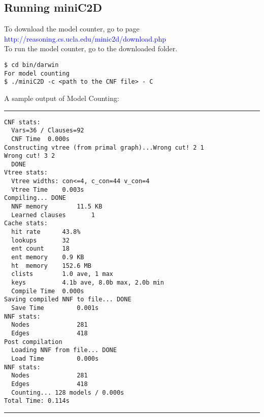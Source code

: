 \subsection*{Running miniC2D}
To download the model counter, go to page \textcolor{blue}{http://reasoning.cs.ucla.edu/minic2d/download.php}\\
To run the model counter, go to the downloaded folder.
\begin{lstlisting}
$ cd bin/darwin
For model counting
$ ./miniC2D -c <path to the CNF file> - C
\end{lstlisting}
A sample output of Model Counting:\\
\noindent\rule{15cm}{0.4pt}
\begin{lstlisting}
CNF stats: 
  Vars=36 / Clauses=92
  CNF Time	0.000s
Constructing vtree (from primal graph)...Wrong cut! 2 1
Wrong cut! 3 2
  DONE
Vtree stats:
  Vtree widths: con<=4, c_con=44 v_con=4
  Vtree Time	0.003s
Compiling... DONE
  NNF memory      	11.5 KB
  Learned clauses      	1
Cache stats:
  hit rate   	43.8%
  lookups    	32
  ent count  	18
  ent memory 	0.9 KB
  ht  memory 	152.6 MB
  clists     	1.0 ave, 1 max
  keys       	4.1b ave, 8.0b max, 2.0b min
  Compile Time	0.000s
Saving compiled NNF to file... DONE
  Save Time       	0.001s
NNF stats:
  Nodes           	281
  Edges           	418
Post compilation
  Loading NNF from file... DONE
  Load Time       	0.000s
NNF stats:
  Nodes           	281
  Edges           	418
  Counting... 128 models / 0.000s
Total Time: 0.114s
\end{lstlisting}
\noindent\rule{15cm}{0.4pt}